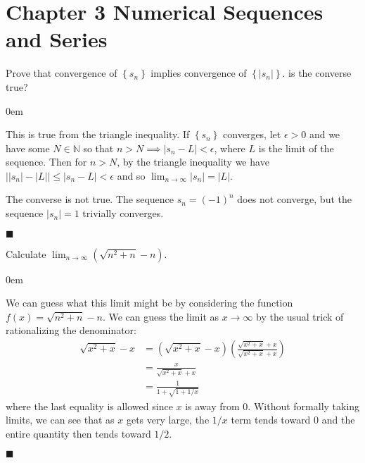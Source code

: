 \documentclass[12pt]{article}
\renewcommand{\qed}{\hfill$\blacksquare$}
\renewenvironment{proof}{\begin{addmargin}[1em]{0em}\begin{newproof}}{\end{newproof}\end{addmargin}\qed}
\newenvironment{problem}[2][Exercise]{\begin{trivlist}
\item[\hskip \labelsep {\bfseries #1}\hskip \labelsep {\bfseries #2.}]}{\end{trivlist}}
\begin{document}
\newpage
\section*{Chapter 3 Numerical Sequences and Series}

\begin{problem}{3.1}
Prove that convergence of $\left\{s_n\right\}$ implies convergence of $\left\{\left|s_n\right|\right\}$. is the converse true?
\end{problem}
\begin{proof}
This is true from the triangle inequality. If $\left\{s_n\right\}$ converges, let $\epsilon>0$ and we have some $N\in \mathbb{N}$ so that $n>N \implies \left| s_n - L\right|<\epsilon$, where $L$ is the limit of the sequence. Then for $n>N$, by the triangle inequality we have $\left|\left|s_n\right|-\left|L\right|\right| \leq \left|s_n-L\right| < \epsilon$ and so $\lim_{n\rightarrow \infty} \left|s_n\right| = \left|L\right|$.

The converse is not true. The sequence $s_n = \left(-1\right)^n$ does not converge, but the sequence $\left|s_n\right|=1$ trivially converges.
\end{proof}


\begin{problem}{3.2}
Calculate $\lim_{n\rightarrow \infty} \left(\sqrt{n^2+n}-n\right)$.
\end{problem}
\begin{proof}
We can guess what this limit might be by considering the function $f\left(x\right) = \sqrt{n^2+n}-n$. We can guess the limit as $x\rightarrow \infty$ by the usual trick of rationalizing the denominator:
\begin{equation*}
\begin{split}
\sqrt{x^2+x}-x & = \left( \sqrt{x^2+x}-x\right)\left( \frac{\sqrt{x^2+x}+x}{\sqrt{x^2+x}+x}\right) \\
& = \frac{x}{\sqrt{x^2+x}+x} \\
& = \frac{1}{1+\sqrt{1+1/x}}
\end{split}
\end{equation*}
where the last equality is allowed since $x$ is away from $0$. Without formally taking limits, we can see that as $x$ gets very large, the $1/x$ term tends toward $0$ and the entire quantity then tends toward $1/2$.
\end{proof}






\end{document}
